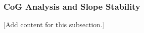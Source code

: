 
\subsubsection{CoG Analysis and Slope Stability}
\label{subsubsec:design_11_3_cog_slope_stability}

[Add content for this subsection.]
